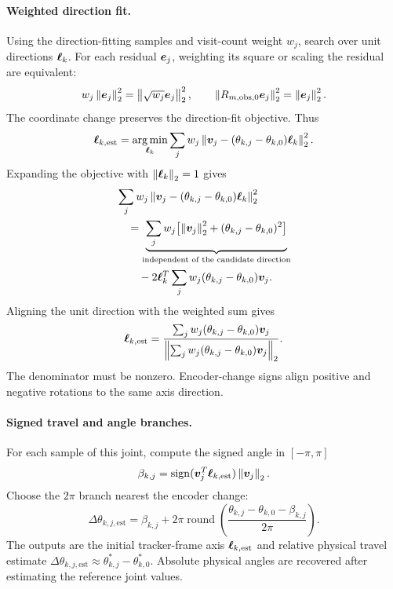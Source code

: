 \documentclass[../main.tex]{subfiles}
\begin{document}
\paragraph{Weighted direction fit.}
Using the direction-fitting samples and visit-count weight $w_j$, search over unit directions $\bm{\ell}_k$. For each residual $\bm{e}_j$, weighting its square or scaling the residual are equivalent:
\begin{equation*}
w_j\left\|\bm{e}_j\right\|_2^2=\left\|\sqrt{w_j}\bm{e}_j\right\|_2^2,\qquad
\left\|R_{m,\mathrm{obs},0}\bm{e}_j\right\|_2^2=\left\|\bm{e}_j\right\|_2^2.
\end{equation*}
The coordinate change preserves the direction-fit objective. Thus
\begin{equation}\label{eq:stepA}
\bm{\ell}_{k,\mathrm{est}}=\underset{\bm{\ell}_k}{\arg\min}
\sum_jw_j
\left\|\bm{v}_j-(\theta_{k,j}-\theta_{k,0})\bm{\ell}_k\right\|_2^{2}.
\end{equation}
Expanding the objective with $\left\|\bm{\ell}_k\right\|_2=1$ gives
\begin{equation*}
\begin{aligned}
&\sum_jw_j\left\|\bm{v}_j-(\theta_{k,j}-\theta_{k,0})\bm{\ell}_k\right\|_2^{2}\\
&\quad=\underbrace{\sum_jw_j
\bigl[\left\|\bm{v}_j\right\|_2^{2}+(\theta_{k,j}-\theta_{k,0})^2\bigr]}_{\text{independent of the candidate direction}}\\
&\qquad-2\bm{\ell}_k^T\sum_jw_j(\theta_{k,j}-\theta_{k,0})\bm{v}_j.
\end{aligned}
\end{equation*}
Aligning the unit direction with the weighted sum gives
\begin{equation*}
\bm{\ell}_{k,\mathrm{est}}=
\frac{\sum_jw_j(\theta_{k,j}-\theta_{k,0})\bm{v}_j}
{\left\|\sum_jw_j(\theta_{k,j}-\theta_{k,0})\bm{v}_j\right\|_2}.
\end{equation*}
The denominator must be nonzero. Encoder-change signs align positive and negative rotations to the same axis direction.

\paragraph{Signed travel and angle branches.}
For each sample of this joint, compute the signed angle in $[-\pi,\pi]$
\begin{equation*}
\beta_{k,j}=\operatorname{sign}(\bm{v}_j^T\bm{\ell}_{k,\mathrm{est}})\left\|\bm{v}_j\right\|_2.
\end{equation*}
Choose the $2\pi$ branch nearest the encoder change:
\begin{equation}\label{eq:wrist-angle-estimate}
\Delta\theta_{k,j,\mathrm{est}}=
\beta_{k,j}+2\pi\operatorname{round}\!\left(
\frac{\theta_{k,j}-\theta_{k,0}-\beta_{k,j}}{2\pi}\right).
\end{equation}
The outputs are the initial tracker-frame axis $\bm{\ell}_{k,\mathrm{est}}$ and relative physical travel estimate $\Delta\theta_{k,j,\mathrm{est}}\approx\theta^*_{k,j}-\theta^*_{k,0}$. Absolute physical angles are recovered after estimating the reference joint values.
\end{document}
